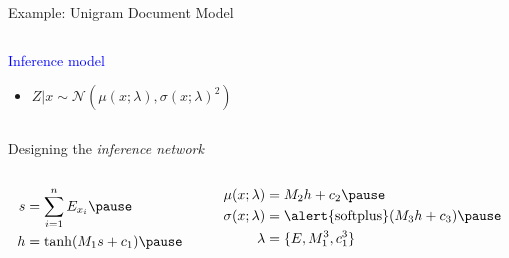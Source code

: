 \begin{frame}{Example: Unigram Document Model}


\begin{columns}
	\begin{column}{0.75\textwidth}  
   		\textcolor{blue}{Inference model}
		\begin{itemize}
			\item $Z|x \sim \mathcal N(\mu(x; \lambda), \sigma(x; \lambda)^2)$
		\end{itemize}
    \end{column}
	\begin{column}{0.2\textwidth}
    \end{column}    
    \end{columns}
    \pause
    
    Designing the \emph{inference network}\pause
    \vspace{-10pt}
    \begin{columns}
    \begin{column}{0.35\textwidth}
    \begin{equation*}
	\begin{aligned}		
		s &= \sum_{i=1}^n E_{x_i} \pause \\
		h &= \tanh(M_1s+c_1)  \pause 		
	\end{aligned}
	\end{equation*}
	\end{column}
	\begin{column}{0.6\textwidth}
	\begin{equation*}
	\begin{aligned}		
		\mu(x; \lambda) &= M_2h + c_2  \pause \\
		\sigma(x; \lambda) &= \alert{\softplus}(M_3h + c_3)  \pause \\
		\lambda &= \{E, M_1^3, c_1^3\}
	\end{aligned}
	\end{equation*}
	\end{column}
	\end{columns}
	

\end{frame}


